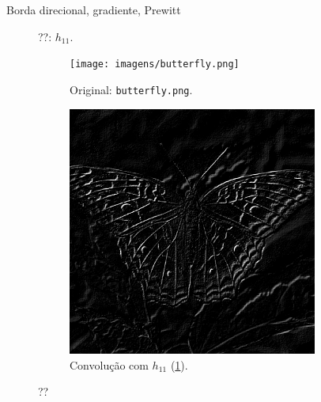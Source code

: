 
Borda direcional, gradiente, Prewitt

\begin{figure}[H]
    \centering
    

    \caption{??: $h_{11}$.}
    \label{fig:h11}
\end{figure}

\begin{figure}[H]
    \centering
    \begin{subfigure}{0.48\textwidth}
        \centering
        \texttt{[image: imagens/butterfly.png]}
        \caption{Original: \texttt{butterfly.png}.}
    \end{subfigure}%
    \begin{subfigure}{0.48\textwidth}
        \centering
        \includegraphics[width=0.9\textwidth]{resultados/butterfly_h11.png}
        \caption{Convolução com $h_{11}$ (\ref{fig:h11}).}
    \end{subfigure}

    \caption{??}
\end{figure}
